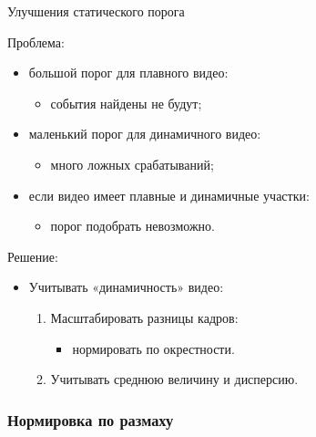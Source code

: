 

\begin{frame}{Улучшения статического порога}
    
    \begin{orange-box}{Проблема:}
        \begin{itemize}
        \item большой порог для плавного видео:
            \begin{itemize}
                \item события найдены не будут;
            \end{itemize}
        \item маленький порог для динамичного видео:
            \begin{itemize}
                \item много ложных срабатываний;
            \end{itemize}
        \item если видео имеет плавные и динамичные участки:
            \begin{itemize}
                \item порог подобрать невозможно.
            \end{itemize}
        \end{itemize}
    \end{orange-box}
    \vspace{1.5em}
    \begin{grass-green-box}{Решение:}
        \begin{itemize}
            \item Учитывать «динамичность» видео:
            \begin{enumerate}
                \item Масштабировать разницы кадров:
                \begin{itemize}
                    \item нормировать по окрестности.
                \end{itemize}
                \item Учитывать среднюю величину и дисперсию.
            \end{enumerate}
        \end{itemize}
    \end{grass-green-box}
    
\end{frame}

\subsubsection*{Нормировка по размаху}

